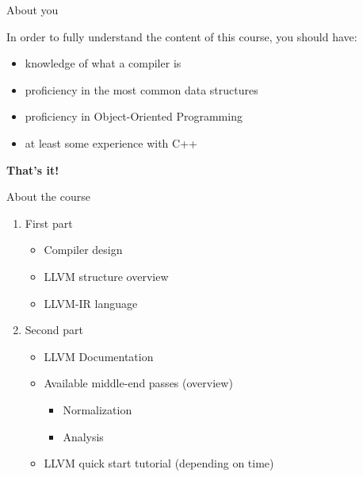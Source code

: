 \begin{frame}[t]{About you}
	\vspace{\fill}
	\begin{center}
  \begin{varwidth}{8.5cm}
  In order to fully understand the content of this course,
  you should have:
  \smallskip
  \begin{itemize}
    \item knowledge of what a compiler is
    \item proficiency in the most common data structures
    \item proficiency in Object-Oriented Programming
    \item at least some experience with C++
  \end{itemize}
  \end{varwidth}
  \medskip
  \end{center}
   \begin{center}
  \textbf{\large That's it!}
  \end{center}
  \vspace{\fill}
\end{frame}

\begin{frame}[t]{About the course}
\begin{center}
\begin{varwidth}{8.5cm}
  \begin{Large}
  \begin{enumerate}
  	\setlength\itemsep{8pt}
    \item First part \vspace{6pt}
      \begin{itemize}
      	\normalsize \setlength\itemsep{4pt}
        \item Compiler design
        \item LLVM structure overview
        \item LLVM-IR language
    	\end{itemize}
    \item Second part \vspace{6pt}
      \begin{itemize}
      \normalsize \setlength\itemsep{4pt}
        \item LLVM Documentation
        \item Available middle-end passes (overview)
        \begin{itemize}
        	\normalsize
          \item Normalization
          \item Analysis
        \end{itemize}
        \item LLVM quick start tutorial (depending on time)
      \end{itemize}
  \end{enumerate}
	\end{Large}
\end{varwidth}
\end{center}
\end{frame}

